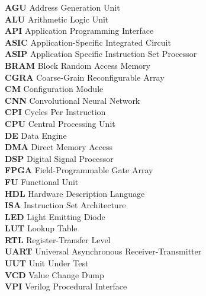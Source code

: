 
\noindent
\textbf{AGU} Address Generation Unit\\
\textbf{ALU} Arithmetic Logic Unit\\
\textbf{API} Application Programming Interface\\
\textbf{ASIC} Application-Specific Integrated Circuit\\
\textbf{ASIP} Application Specific Instruction Set Processor\\
\textbf{BRAM} Block Random Access Memory\\
\textbf{CGRA} Coarse-Grain Reconfigurable Array\\
\textbf{CM} Configuration Module\\
\textbf{CNN} Convolutional Neural Network\\
\textbf{CPI} Cycles Per Instruction\\
\textbf{CPU} Central Processing Unit\\
\textbf{DE} Data Engine\\
\textbf{DMA} Direct Memory Access\\
\textbf{DSP} Digital Signal Processor\\
\textbf{FPGA} Field-Programmable Gate Array\\
\textbf{FU} Functional Unit\\
\textbf{HDL} Hardware Description Language\\
\textbf{ISA} Instruction Set Architecture\\
\textbf{LED} Light Emitting Diode\\
\textbf{LUT} Lookup Table\\
\textbf{RTL} Register-Transfer Level\\
\textbf{UART} Universal Asynchronous Receiver-Transmitter\\
\textbf{UUT} Unit Under Test\\
\textbf{VCD} Value Change Dump\\
\textbf{VPI} Verilog Procedural Interface\\
